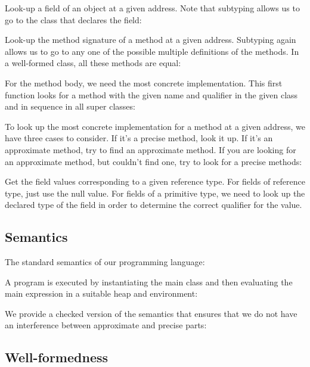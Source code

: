 \documentclass[final,10pt,twoside]{article}
\begin{document}
Look-up a field of an object at a given address.
Note that subtyping allows us to go to the class that declares the
field:

\ottdefnrftype


Look-up the method signature of a method at a given address.
Subtyping again allows us to go to any one of the possible multiple
definitions of the methods. In a well-formed class, all these methods
are equal:

\ottdefnrmsign


For the method body, we need the most concrete implementation.
This first function looks for a method with the given name and
qualifier in the given class and in sequence in all super classes:

\ottdefnsmbodyc


To look up the most concrete implementation for a method at a given
address, we have three cases to consider.
If it's a precise method, look it up.
If it's an approximate method, try to find an approximate method.
If you are looking for an approximate method, but couldn't find one,
try to look for a precise methods:

\ottdefnrmbody


Get the field values corresponding to a given reference type.
For fields of reference type, just use the null value.
For fields of a primitive type, we need to look up the declared type
of the field in order to determine the correct qualifier for the
value.

\ottdefnfvsinit


\subsection{Semantics}

The standard semantics of our programming language:

\ottdefnsemantics


A program is executed by instantiating the main class and then
evaluating the main expression in a suitable heap and environment:

\ottdefnsemanticsXXprg


We provide a checked version of the semantics that ensures that we do
not have an interference between approximate and precise parts:

\ottdefncheckedsemantics


\subsection{Well-formedness}
\end{document}
